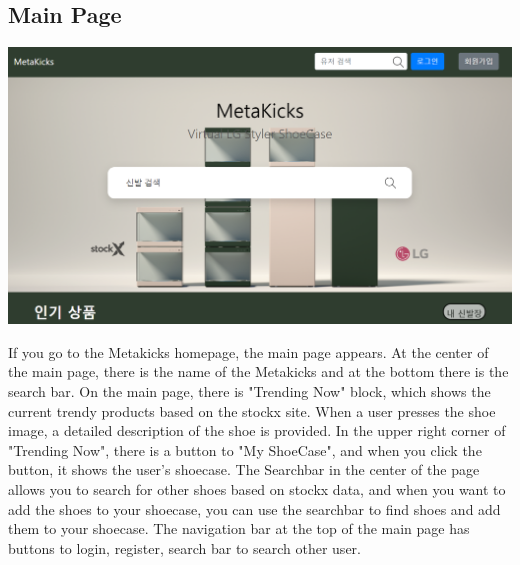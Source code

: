 \documentclass[conference]{IEEEtran}
\begin{document}
\subsection{Main Page}
\centerline{\includegraphics[scale=0.3]{pics/main_page.png}}
If you go to the Metakicks homepage, the main page appears. At the center of the main page, there is the name of  the Metakicks and at the bottom there is the search bar. On the main page, there is "Trending Now" block, which shows the current trendy products based on the stockx site. When a user presses the shoe image, a detailed description of the shoe is provided. In the upper right corner of "Trending Now", there is a button to "My ShoeCase", and when you click the button, it shows the user's shoecase. The Searchbar in the center of the page allows you to search for other shoes based on stockx data, and when you want to add the shoes to your shoecase, you can use the searchbar to find shoes and add them to your shoecase. The navigation bar at the top of the main page has buttons to login, register, search bar to search other user.\\\\
\end{document}
